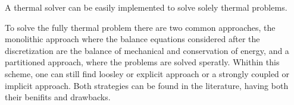 A thermal solver can be easily implemented to solve solely thermal problems.

To solve the fully thermal problem there are two common approaches, the monolithic approach where the balance equations considered after the discretization are the balance of mechanical and conservation of energy, and a partitioned approach, where the problems are solved speratly.
Whithin this scheme, one can still find loosley or explicit approach or a strongly coupled or implicit approach.
Both strategies can be found in the literature, having both their benifits and drawbacks.

% 
% 

